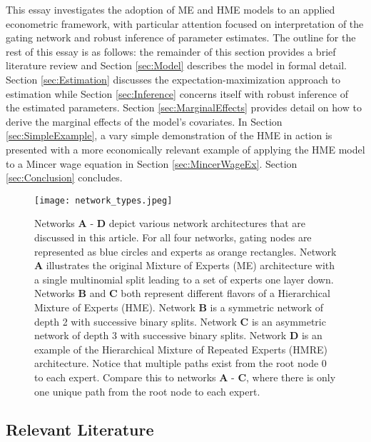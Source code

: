\documentclass[12pt]{article}
\begin{document}
\bigskip

This essay investigates the adoption of ME and HME models to an applied
econometric framework, with particular attention focused on interpretation of
the gating network and robust inference of parameter estimates. The outline for the
rest of this essay is as follows: the remainder of this section
provides a brief literature review and Section \ref{sec:Model} describes
the model in formal detail. Section \ref{sec:Estimation} discusses the
expectation-maximization approach to estimation while Section \ref{sec:Inference}
concerns itself with robust inference of the estimated parameters.
Section \ref{sec:MarginalEffects} provides detail on how to derive the
marginal effects of the model's covariates. In Section \ref{sec:SimpleExample},
a vary simple demonstration of the HME in action is presented with 
a more economically relevant example of applying the HME model to
a Mincer wage equation in Section \ref{sec:MincerWageEx}. Section
\ref{sec:Conclusion} concludes.

\begin{figure}[!ht]
  \centering
  \texttt{[image: network\_types.jpeg]}
  \caption{Networks \textbf{A} - \textbf{D} depict various network
  architectures that are discussed in this article. For all four networks,
  gating nodes are represented as blue circles and experts as orange
  rectangles. Network \textbf{A} illustrates the original Mixture of
  Experts (ME) architecture with a single multinomial split leading
  to a set of experts one layer down. Networks \textbf{B} and \textbf{C} both
  represent different flavors of a Hierarchical Mixture of Experts (HME). Network
  \textbf{B} is a symmetric network of depth 2 with successive binary splits.
  Network \textbf{C} is an asymmetric network of depth 3 with successive
  binary splits. Network \textbf{D} is an example of the Hierarchical
  Mixture of Repeated Experts (HMRE) architecture. Notice that multiple paths
  exist from the root node $0$ to each expert. Compare this to networks
  \textbf{A} - \textbf{C}, where there is only one unique path from the root
  node to each expert.}
  \label{fig:network_comparison}
\end{figure}


\subsection{Relevant Literature}
\end{document}
